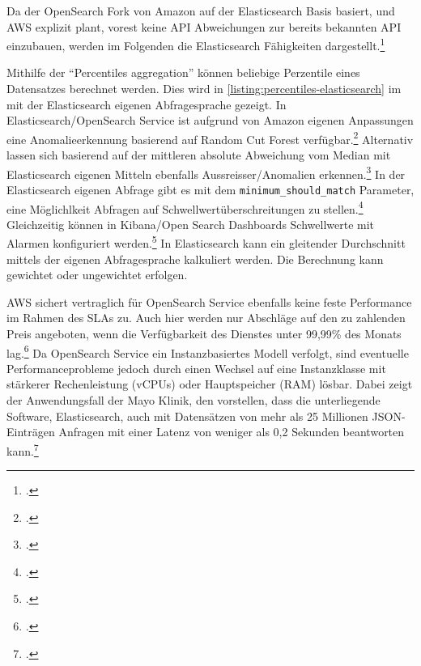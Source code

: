 \label{anhang:vergleich-opensearch}
Da der OpenSearch Fork von Amazon auf der Elasticsearch Basis basiert, und \ac{AWS} explizit plant, vorest keine \ac{API} Abweichungen zur bereits bekannten \ac{API} einzubauen, werden im Folgenden die Elasticsearch Fähigkeiten dargestellt.\footcite[Vgl.][]{Meadows.2021}

Mithilfe der \enquote{Percentiles aggregation} können beliebige Perzentile eines Datensatzes berechnet werden. Dies wird in \autoref{listing:percentiles-elasticsearch} im  mit der Elasticsearch eigenen Abfragesprache gezeigt. 
In Elasticsearch/OpenSearch Service ist aufgrund von Amazon eigenen Anpassungen eine Anomalieerkennung basierend auf Random Cut Forest verfügbar.\footcite[Vgl.][]{AmazonWebServicesInc..o.J.al}
Alternativ lassen sich basierend auf der mittleren absolute Abweichung vom Median mit Elasticsearch eigenen Mitteln ebenfalls Aussreisser/Anomalien erkennen.\footcite[Vgl.][]{ElasticsearchInc..o.J.c} 
In der Elasticsearch eigenen Abfrage gibt es mit dem \texttt{minimum_should_match} Parameter, eine Möglichlkeit Abfragen auf Schwellwertüberschreitungen zu stellen.\footcite[Vgl.][]{ElasticsearchInc..o.J.e}
Gleichzeitig können in Kibana/Open Search Dashboards Schwellwerte mit Alarmen konfiguriert werden.\footcite[Vgl.][]{Handler.2019}
In Elasticsearch kann ein gleitender Durchschnitt mittels der eigenen Abfragesprache kalkuliert werden. Die Berechnung kann gewichtet oder ungewichtet erfolgen.


\ac{AWS} sichert vertraglich für OpenSearch Service ebenfalls keine feste Performance im Rahmen des \acp{SLA} zu. Auch hier werden nur Abschläge auf den zu zahlenden Preis angeboten, wenn die Verfügbarkeit des Dienstes unter 99,99\% des Monats lag.\footcite[Vgl.][]{AmazonWebServicesInc..2019} Da OpenSearch Service ein Instanzbasiertes Modell verfolgt, sind eventuelle Performanceprobleme jedoch durch einen Wechsel auf eine Instanzklasse mit stärkerer Rechenleistung (vCPUs) oder Hauptspeicher (\ac{RAM}) lösbar. Dabei zeigt der Anwendungsfall der Mayo Klinik, den \citeauthor{Chen.2017} vorstellen, dass die unterliegende Software, Elasticsearch, auch mit Datensätzen von mehr als 25 Millionen \ac{JSON}-Einträgen Anfragen mit einer Latenz von weniger als 0,2 Sekunden beantworten kann.\footcite[Vgl.][]{Chen.2017}